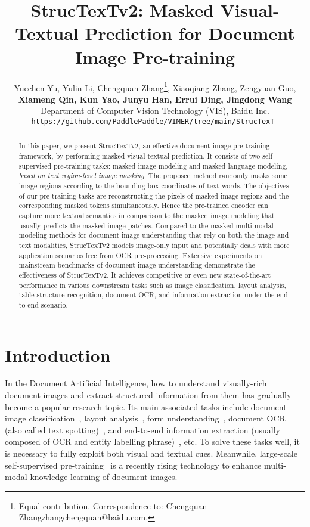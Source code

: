 \documentclass{article} \usepackage{iclr2023_conference,times}
\title{StrucTexTv2: Masked Visual-Textual Prediction for Document Image Pre-training}
\author{Yuechen Yu\textsuperscript{\rm }, Yulin Li\textsuperscript{\rm }, Chengquan Zhang\textsuperscript{\rm }\thanks{\rm  Equal contribution. Correspondence to: Chengquan Zhangzhangchengquan@baidu.com.}, Xiaoqiang Zhang, Zengyuan Guo, \\
\textbf{Xiameng Qin, Kun Yao, Junyu Han, Errui Ding, Jingdong Wang} \\
Department of Computer Vision Technology (VIS), Baidu Inc.\\
\texttt{\href{https://github.com/PaddlePaddle/VIMER/tree/main/StrucTexT}{https://github.com/PaddlePaddle/VIMER/tree/main/StrucTexT}
}
}
\begin{document}
\maketitle

\begin{abstract}
In this paper, we present StrucTexTv2, an effective document image pre-training framework, by performing masked visual-textual prediction. It consists of two self-supervised pre-training tasks: masked image modeling and masked language modeling, \emph{based on text region-level image masking}. The proposed method randomly masks some image regions according to the bounding box coordinates of text words. The objectives of our pre-training tasks are reconstructing the pixels of masked image regions and the corresponding masked tokens simultaneously. Hence the pre-trained encoder can capture more textual semantics in comparison to the masked image modeling that usually predicts the masked image patches. Compared to the masked multi-modal modeling methods for document image understanding that rely on both the image and text modalities, StrucTexTv2 models image-only input and potentially deals with more application scenarios free from OCR pre-processing. Extensive experiments on mainstream benchmarks of document image understanding demonstrate the effectiveness of StrucTexTv2. It achieves competitive or even new state-of-the-art performance in various downstream tasks such as image classification, layout analysis, table structure recognition, document OCR, and information extraction under the end-to-end scenario. 




\end{abstract}

\section{Introduction}
In the Document Artificial Intelligence, how to understand visually-rich document images and extract structured information from them has gradually become a popular research topic. Its main associated tasks include document image classification~\cite{icdar15cdip}, layout analysis~\cite{zhong2019publaynet}, form understanding~\cite{jaume2019funsd}, document OCR (also called text spotting)~\cite{li2017towards,lyu2018mask}, and end-to-end information extraction (usually composed of OCR and entity labelling phrase)~\cite{WangLJT0ZWWC21}, etc. To solve these tasks well, it is necessary to fully exploit both visual and textual cues. Meanwhile, large-scale self-supervised pre-training~\cite{li2021structurallm,appalaraju2021docformer,xu2020layoutlm,xu2020layoutlmv2,huang2022layoutlmv3,nips2021udoc} is a recently rising technology to enhance multi-modal knowledge learning of document images.
\end{document}
